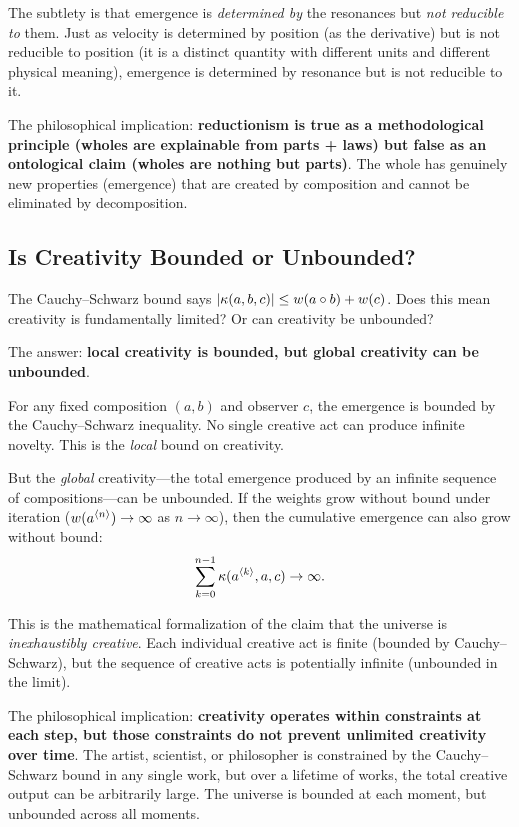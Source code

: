 The subtlety is that emergence is \emph{determined by} the resonances but
\emph{not reducible to} them. Just as velocity is determined by position
(as the derivative) but is not reducible to position (it is a distinct
quantity with different units and different physical meaning), emergence is
determined by resonance but is not reducible to it.

The philosophical implication: \textbf{reductionism is true as a methodological
principle (wholes are explainable from parts + laws) but false as an ontological
claim (wholes are nothing but parts)}. The whole has genuinely new properties
(emergence) that are created by composition and cannot be eliminated by
decomposition.

\subsection{Is Creativity Bounded or Unbounded?}

The Cauchy--Schwarz bound says $|\kappa(a, b, c)| \leq w(a \circ b)
+ w(c)$. Does this mean creativity is fundamentally limited? Or can
creativity be unbounded?

The answer: \textbf{local creativity is bounded, but global creativity can be
unbounded}.

For any fixed composition $(a, b)$ and observer $c$, the emergence is bounded
by the Cauchy--Schwarz inequality. No single creative act can produce infinite
novelty. This is the \emph{local} bound on creativity.

But the \emph{global} creativity---the total emergence produced by an infinite
sequence of compositions---can be unbounded. If the weights grow without bound
under iteration ($w(a^{\langle n \rangle}) \to \infty$ as $n \to \infty$), then
the cumulative emergence can also grow without bound:
\[
  \sum_{k=0}^{n-1} \kappa(a^{\langle k \rangle}, a, c) \to \infty.
\]

This is the mathematical formalization of the claim that the universe is
\emph{inexhaustibly creative}. Each individual creative act is finite (bounded
by Cauchy--Schwarz), but the sequence of creative acts is potentially infinite
(unbounded in the limit).

The philosophical implication: \textbf{creativity operates within constraints
at each step, but those constraints do not prevent unlimited creativity over time}.
The artist, scientist, or philosopher is constrained by the Cauchy--Schwarz
bound in any single work, but over a lifetime of works, the total creative
output can be arbitrarily large. The universe is bounded at each moment, but
unbounded across all moments.

